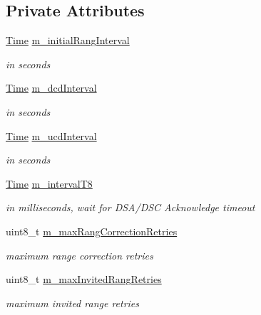 \subsection*{Private Attributes}
\begin{DoxyCompactItemize}
\item 
\hyperlink{classns3_1_1Time}{Time} \hyperlink{classns3_1_1BaseStationNetDevice_aa3eb316606a9799a9cf39b99a94a7247}{m\+\_\+initial\+Rang\+Interval}
\begin{DoxyCompactList}\small\item\em in seconds \end{DoxyCompactList}\item 
\hyperlink{classns3_1_1Time}{Time} \hyperlink{classns3_1_1BaseStationNetDevice_a110c3258d57e4ddf85bb0b8f27d684e9}{m\+\_\+dcd\+Interval}
\begin{DoxyCompactList}\small\item\em in seconds \end{DoxyCompactList}\item 
\hyperlink{classns3_1_1Time}{Time} \hyperlink{classns3_1_1BaseStationNetDevice_a9b2fb8e8eaad00542d5cb8e085eb73de}{m\+\_\+ucd\+Interval}
\begin{DoxyCompactList}\small\item\em in seconds \end{DoxyCompactList}\item 
\hyperlink{classns3_1_1Time}{Time} \hyperlink{classns3_1_1BaseStationNetDevice_ae3319aa5330a4838f03c37c9c076b9cd}{m\+\_\+interval\+T8}
\begin{DoxyCompactList}\small\item\em in milliseconds, wait for D\+S\+A/\+D\+SC Acknowledge timeout \end{DoxyCompactList}\item 
uint8\+\_\+t \hyperlink{classns3_1_1BaseStationNetDevice_a5cc4e01da1a9e7d7b056cb992dd4b0de}{m\+\_\+max\+Rang\+Correction\+Retries}
\begin{DoxyCompactList}\small\item\em maximum range correction retries \end{DoxyCompactList}\item 
uint8\+\_\+t \hyperlink{classns3_1_1BaseStationNetDevice_a850b8ec492ee39fb3c9f55a6b232702c}{m\+\_\+max\+Invited\+Rang\+Retries}
\begin{DoxyCompactList}\small\item\em maximum invited range retries \end{DoxyCompactList}\item 

\end{DoxyCompactItemize}
